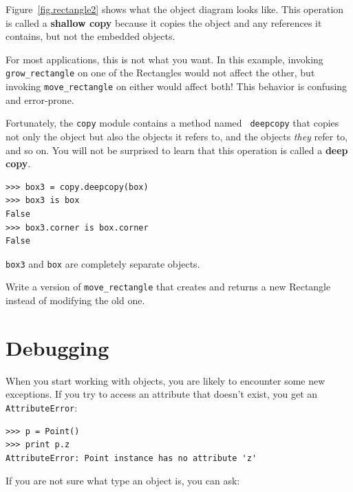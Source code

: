 \documentclass[10pt]{book}
\begin{document}
Figure~\ref{fig.rectangle2} shows what the object diagram looks like.
This operation is called a {\bf shallow copy} because it copies the
object and any references it contains, but not the embedded objects.

For most applications, this is not what you want.  In this example,
invoking \verb"grow_rectangle" on one of the Rectangles would not
affect the other, but invoking \verb"move_rectangle" on either would
affect both!  This behavior is confusing and error-prone.

Fortunately, the {\tt copy} module contains a method named {\tt
deepcopy} that copies not only the object but also
the objects it refers to, and the objects {\em they} refer to,
and so on.
You will not be surprised to learn that this operation is
called a {\bf deep copy}.

\begin{verbatim}
>>> box3 = copy.deepcopy(box)
>>> box3 is box
False
>>> box3.corner is box.corner
False
\end{verbatim}
%
{\tt box3} and {\tt box} are completely separate objects.


\begin{exercise}

Write a version of \verb"move_rectangle" that creates and
returns a new Rectangle instead of modifying the old one.

\end{exercise}


\section{Debugging}
\label{hasattr}

When you start working with objects, you are likely to encounter
some new exceptions.  If you try to access an attribute
that doesn't exist, you get an {\tt AttributeError}:

\begin{verbatim}
>>> p = Point()
>>> print p.z
AttributeError: Point instance has no attribute 'z'
\end{verbatim}
%
If you are not sure what type an object is, you can ask:
\end{document}
